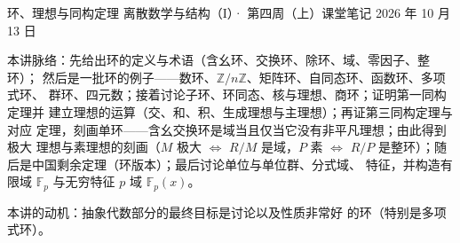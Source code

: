 \documentclass[cjk]{loom}
\newcommand{\Z}{\mathbb{Z}}
\newcommand{\F}{\mathbb{F}}                %
\begin{document}
\loomcover
  {环、理想与同构定理}
  {离散数学与结构（I）· 第四周（上）课堂笔记}
  {}
  {2026 年 10 月 13 日}

\begin{strand}
本讲脉络：先给出环的定义与术语（含幺环、交换环、除环、域、零因子、整环）；
然后是一批环的例子——数环、$\Z/n\Z$、矩阵环、自同态环、函数环、多项式环、
群环、四元数；接着讨论子环、环同态、核与理想、商环；证明第一同构定理并
建立理想的运算（交、和、积、生成理想与主理想）；再证第三同构定理与对应
定理，刻画单环——含幺交换环是域当且仅当它没有非平凡理想；由此得到极大
理想与素理想的刻画（$M$ 极大 $\iff$ $R/M$ 是域，$P$ 素 $\iff$ $R/P$
是整环）；随后是中国剩余定理（环版本）；最后讨论单位与单位群、分式域、
特征，并构造有限域 $\F_p$ 与无穷特征 $p$ 域 $\F_p(x)$。

本讲的动机：抽象代数部分的最终目标是讨论以及性质非常好
的环（特别是多项式环）。
\end{strand}

\clearpage
{\small\tableofcontents}

\clearpage






\end{document}
